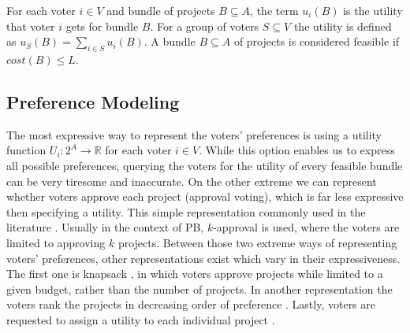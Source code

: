 \documentclass[runningheads]{llncs}
\newcommand{\kibitz}[2]{\ifnum\Comments=1{\color{#1}{#2}}\fi}
\newcommand{\rmr}[1]{\kibitz{red}{[Reshef says:#1]}}
\begin{document}
     For each voter $i\in V$ and bundle of projects $B\subseteq A$, the term $u_i(B)$ is the utility that voter $i$ gets for bundle $B$. For a group of voters $S\subseteq V$ the utility is defined as $u_S(B)=\sum_{i\in S}u_i(B).$
A  bundle $B\subseteq A$ of projects   is considered  feasible if  $cost(B)\leq L$. 



\subsection{Preference Modeling}\label{input}


The most expressive way to represent the voters' preferences is using a utility function $U_i:2^A\rightarrow \mathbb R$  for each voter $i\in V$. While this option enables us to express all possible preferences, querying the voters for the utility of every feasible bundle can be very tiresome and inaccurate.
On the other extreme we can represent whether voters approve each project (approval voting),  
which is far less expressive then specifying a utility. This simple representation commonly  used in the literature \cite{aziz2020participatory, aziz2017proportionally}.
Usually in the context of PB, $k$-approval is used, where the voters are limited to approving $k$ projects.
Between those two extreme ways of representing  voters' preferences,   other 
representations exist which vary in their expressiveness. The first one is knapsack \cite{goel2019knapsack, goel2016knapsack}, 
in which voters approve projects while  limited to a given budget, rather than the number of projects. In another representation the voters  rank   the projects  in decreasing order of preference  \cite{benade2020preference}.
Lastly, voters are requested to assign a utility to each individual project \cite{peters2020proportional}.
\end{document}
